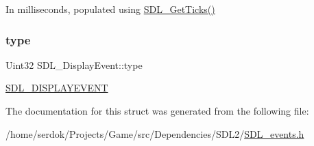 In milliseconds, populated using \hyperlink{SDL__timer_8h_a0b9bc71d6287e0ffafdc3419760fe2b3}{S\+D\+L\+\_\+\+Get\+Ticks()} \mbox{\label{structSDL__DisplayEvent_a5f4993ce9c5289a2ac046ae7a6dff544}} 
\subsubsection{\texorpdfstring{type}{type}}
{\footnotesize\ttfamily Uint32 S\+D\+L\+\_\+\+Display\+Event\+::type}

\hyperlink{SDL__events_8h_a3b589e89be6b35c02e0dd34a55f3fccaa825818ce6265316146d7288601fd5974}{S\+D\+L\+\_\+\+D\+I\+S\+P\+L\+A\+Y\+E\+V\+E\+NT} 

The documentation for this struct was generated from the following file\+:\begin{DoxyCompactItemize}
\item 
/home/serdok/\+Projects/\+Game/src/\+Dependencies/\+S\+D\+L2/\hyperlink{SDL__events_8h}{S\+D\+L\+\_\+events.\+h}\end{DoxyCompactItemize}
